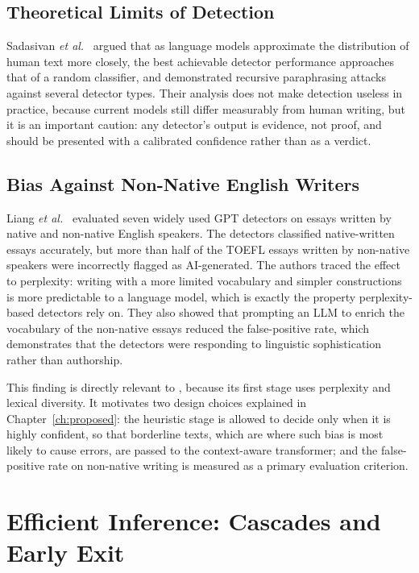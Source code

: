 \subsection{Theoretical Limits of Detection}

Sadasivan \textit{et al.}~\cite{sadasivan2023reliably} argued that as language
models approximate the distribution of human text more closely, the best
achievable detector performance approaches that of a random classifier, and
demonstrated recursive paraphrasing attacks against several detector types.
Their analysis does not make detection useless in practice, because current
models still differ measurably from human writing, but it is an important
caution: any detector's output is evidence, not proof, and should be presented
with a calibrated confidence rather than as a verdict.

\subsection{Bias Against Non-Native English Writers}

Liang \textit{et al.}~\cite{liang2023biased} evaluated seven widely used GPT
detectors on essays written by native and non-native English speakers. The
detectors classified native-written essays accurately, but more than half of
the TOEFL essays written by non-native speakers were incorrectly flagged as
AI-generated. The authors traced the effect to perplexity: writing with a more
limited vocabulary and simpler constructions is more predictable to a language
model, which is exactly the property perplexity-based detectors rely on. They
also showed that prompting an LLM to enrich the vocabulary of the non-native
essays reduced the false-positive rate, which demonstrates that the detectors
were responding to linguistic sophistication rather than authorship.

This finding is directly relevant to \veriscript{}, because its first stage
uses perplexity and lexical diversity. It motivates two design choices
explained in Chapter~\ref{ch:proposed}: the heuristic stage is allowed to
decide only when it is highly confident, so that borderline texts, which are
where such bias is most likely to cause errors, are passed to the
context-aware transformer; and the false-positive rate on non-native writing
is measured as a primary evaluation criterion.

\section{Efficient Inference: Cascades and Early Exit}

